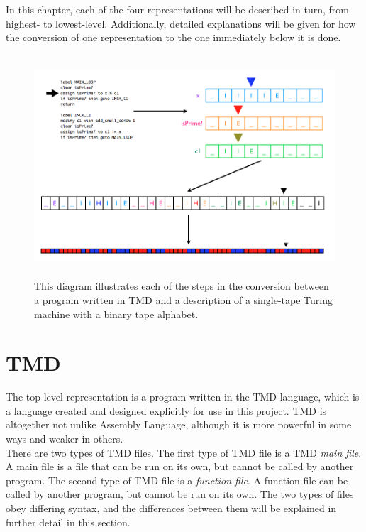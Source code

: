\documentclass{report}
\begin{document}
In this chapter, each of the four representations will be described in turn, from highest- to lowest-level. Additionally, detailed explanations will be given for how the conversion of one representation to the one immediately below it is done.

\begin{figure} 
\begin{center} 
\includegraphics[height=3.25in,width=5in,angle=0]{figs/process.png} 
\caption{This diagram illustrates each of the steps in the conversion between a program written in TMD and a description of a single-tape Turing machine with a binary tape alphabet.\label{fig:process}} 
\end{center} 
\end{figure}  

\section{TMD}

The top-level representation is a program written in the TMD language, which is a language created and designed explicitly for use in this project. TMD is altogether not unlike Assembly Language, although it is more powerful in some ways and weaker in others. \\

There are two types of TMD files. The first type of TMD file is a TMD \emph{main file}. A main file is a file that can be run on its own, but cannot be called by another program. The second type of TMD file is a \emph{function file}. A function file can be called by another program, but cannot be run on its own. The two types of files obey differing syntax, and the differences between them will be explained in further detail in this section.
\end{document}
